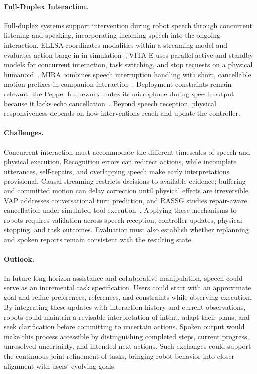 \paragraph{Full-Duplex Interaction.}
Full-duplex systems support intervention during robot speech through concurrent listening and speaking, incorporating incoming speech into the ongoing interaction. ELLSA coordinates modalities within a streaming model and evaluates action barge-in in simulation~\citep{emb_wang2026ellsa}; VITA-E uses parallel active and standby models for concurrent interaction, task switching, and stop requests on a physical humanoid~\citep{emb_liu2025vitae}. MIRA combines speech interruption handling with short, cancellable motion prefixes in companion interaction~\citep{emb_lin2026mira}. Deployment constraints remain relevant: the Pepper framework mutes its microphone during speech output because it lacks echo cancellation~\citep{emb_studerus2026pepper}. Beyond speech reception, physical responsiveness depends on how interventions reach and update the controller.

\paragraph{Challenges.}
Concurrent interaction must accommodate the different timescales of speech and physical execution. Recognition errors can redirect actions, while incomplete utterances, self-repairs, and overlapping speech make early interpretations provisional. Causal streaming restricts decisions to available evidence; buffering and committed motion can delay correction until physical effects are irreversible. VAP addresses conversational turn prediction, and RASSG studies repair-aware cancellation under simulated tool execution~\citep{emb_inoue2024vap,emb_hu2026rassg}. Applying these mechanisms to robots requires validation across speech reception, controller updates, physical stopping, and task outcomes. Evaluation must also establish whether replanning and spoken reports remain consistent with the resulting state.

\paragraph{Outlook.}
In future long-horizon assistance and collaborative manipulation, speech could serve as an incremental task specification. Users could start with an approximate goal and refine preferences, references, and constraints while observing execution. By integrating these updates with interaction history and current observations, robots could maintain a revisable interpretation of intent, adapt their plans, and seek clarification before committing to uncertain actions. Spoken output would make this process accessible by distinguishing completed steps, current progress, unresolved uncertainty, and intended next actions. Such exchanges could support the continuous joint refinement of tasks, bringing robot behavior into closer alignment with users' evolving goals.

